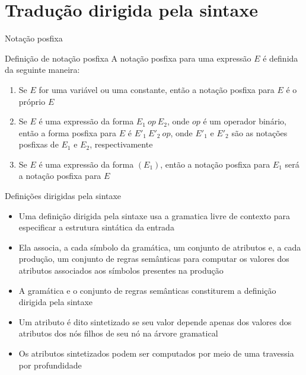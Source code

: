\section{Tradução dirigida pela sintaxe}

\begin{frame}[fragile]{Notação posfixa}

    \begin{block}{Definição de notação posfixa}
    A notação posfixa para uma expressão $E$ é definida da seguinte maneira:

    \begin{enumerate}
        \item Se $E$ for uma variável ou uma constante, então a notação posfixa para $E$ é o próprio $E$

        \item Se $E$ é uma expressão da forma $E_1\ op\ E_2$, onde $op$ é um operador binário, então a forma posfixa para $E$ é $E'_1\ E'_2\ op$, onde $E'_1$ e 
            $E'_2$ são as notações posfixas de $E_1$ e $E_2$, respectivamente

        \item Se $E$ é uma expressão da forma $(E_1)$, então a notação posfixa para $E_1$ será a notação posfixa para $E$
    \end{enumerate}
    \end{block}

\end{frame}

\begin{frame}[fragile]{Definições dirigidas pela sintaxe}

    \begin{itemize}
        \item Uma definição dirigida pela sintaxe usa a gramatica livre de contexto para especificar a estrutura sintática da entrada
        \pause

        \item Ela associa, a cada símbolo da gramática, um conjunto de atributos e, a cada produção, um conjunto de regras semânticas para computar os valores
            dos atributos associados aos símbolos presentes na produção
        \pause

        \item A gramática e o conjunto de regras semânticas constiturem a definição dirigida pela sintaxe
        \pause

        \item Um atributo é dito sintetizado se seu valor depende apenas dos valores dos atributos dos nós filhos de seu nó na árvore gramatical
        \pause

        \item Os atributos sintetizados podem ser computados por meio de uma travessia por profundidade
    \end{itemize}

\end{frame}

